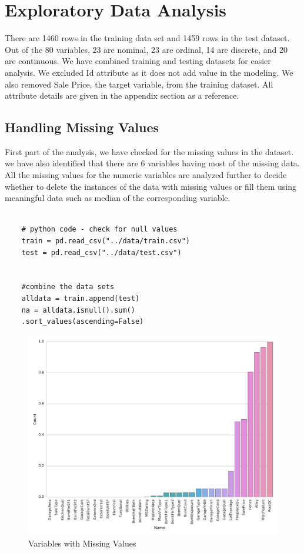 \documentclass[sigconf]{acmart}
\begin{document}
	\section{Exploratory Data Analysis} 
	
	There are 1460 rows in the training data set and 1459 rows in the test dataset. Out of the 80 variables, 23 are nominal, 23 are ordinal, 14 are discrete, and 20 are continuous. We have combined training and testing datasets for easier analysis. We excluded Id attribute as it does not add value in the modeling. We also removed Sale Price, the target variable, from the training dataset. All attribute details are given in the appendix section as a reference.
	\subsection{Handling Missing Values}
	
	First part of the analysis, we have checked for the missing values in the dataset. we have also identified that there are 6 variables having most of the missing data. All the missing values for the numeric variables are analyzed further to decide whether to delete the instances of the data with missing values or fill them using meaningful data such as median of the corresponding variable.
	
	\begin{verbatim}
	
	# python code - check for null values
	train = pd.read_csv("../data/train.csv")
	test = pd.read_csv("../data/test.csv")
	
	
	#combine the data sets
	alldata = train.append(test)	
	na = alldata.isnull().sum()
	.sort_values(ascending=False)
	\end{verbatim}
	
	\begin{figure}[H]
		\centering
		\includegraphics[width=0.9\columnwidth]{images/missing_values}	
		\caption{Variables with Missing Values} \label{fig:missing_values} 
	\end{figure}
	
\end{document}
